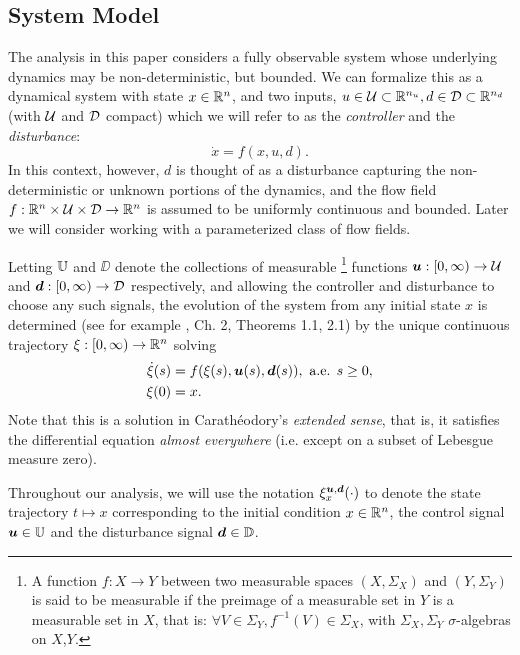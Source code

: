 \documentclass[letterpaper, 10 pt, conference]{ieeeconf}
\begin{document}
\subsection{System Model \label{subsec:dynamics}}

The analysis in this paper considers a fully observable system whose underlying dynamics may be non-deterministic, but bounded. 
We can formalize this as a dynamical system with state $x\in\mathbb{R}^n$, and two inputs, $u\in\mathcal{U}\subset\mathbb{R}^{n_u},  d\in\mathcal{D}\subset\mathbb{R}^{n_d}$
(with $\mathcal{U}$ and $\mathcal{D}$ compact)
which we will refer to as the \emph{controller} and the \emph{disturbance}:
\begin{equation}\label{fxud}
\dot{x} = f(x,u, d).
\end{equation}
In this context, however, 
$d$ is thought of as a disturbance capturing the non-deterministic or unknown portions of the dynamics, and the flow field $f: \mathbb{R}^n \times \mathcal{U} \times \mathcal{D}\rightarrow\mathbb{R}^n$ is assumed to be uniformly continuous and bounded. Later we will consider working with a parameterized class of flow fields.

Letting $\mathbb{U} $ and $\DD$ denote the collections of measurable%
	\footnote{A function $f:X\to Y$ between two measurable spaces $(X,\Sigma_X)$ and $(Y,\Sigma_Y)$
	is said to be measurable if the preimage of a measurable set in $Y$ is a measurable set in $X$, that is:
	$\forall V\in\Sigma_Y, f^{-1}(V)\in\Sigma_X$, with $\Sigma_X,\Sigma_Y$ $\sigma$-algebras on $X$,$Y$.}
functions $\bm u: [0,\infty)\to \mathcal{U} $ and $\bm d: [0,\infty)\to \mathcal{D}$ respectively,
and allowing the controller and disturbance to choose any such signals,
the evolution of the system
from any initial state $x$
is determined (see for example \cite{Coddington1955}, Ch. 2, Theorems 1.1, 2.1) by the unique continuous trajectory $\xi:[0,\infty)\to\mathbb{R}^n$ solving
\begin{equation}\label{eq:xdot}
\begin{split}
\dot{\xi}(s) &= f(\xi(s),\bm{u}(s),\bm{d}(s)), \text{ a.e. }s\ge 0,\\
\xi(0) &= x.
\end{split}
\end{equation}
Note that this is a solution in Carath\'eodory's \emph{extended sense}, that is, it satisfies the differential equation \emph{almost everywhere} (i.e. except on a subset of Lebesgue measure zero).


Throughout our analysis, we will use the notation $\xi_{x}^{\bm{u},\bm{d}}(\cdot)$ to denote the state trajectory $t\mapsto x$ corresponding to the initial condition $x\in\mathbb{R}^n$, the control signal $\bm{u}\in\mathbb{U}$ and the disturbance signal $\bm{d}\in\mathbb{D}$.
\end{document}
